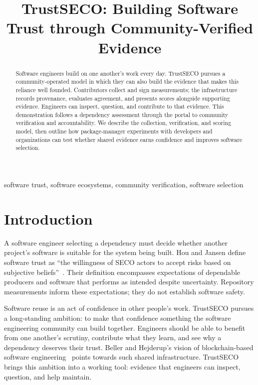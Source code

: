 \documentclass[10pt,conference]{IEEEtran}
\begin{document}
\title{TrustSECO: Building Software Trust through Community-Verified Evidence}
\author{}
\maketitle

\begin{abstract}
Software engineers build on one another's work every day. TrustSECO pursues a community-operated model in which they can also build the evidence that makes this reliance well founded. Contributors collect and sign measurements; the infrastructure records provenance, evaluates agreement, and presents scores alongside supporting evidence. Engineers can inspect, question, and contribute to that evidence. This demonstration follows a dependency assessment through the portal to community verification and accountability. We describe the collection, verification, and scoring model, then outline how package-manager experiments with developers and organizations can test whether shared evidence earns confidence and improves software selection.
\end{abstract}
\begin{IEEEkeywords}
software trust, software ecosystems, community verification, software selection
\end{IEEEkeywords}

\section{Introduction}
A software engineer selecting a dependency must decide whether another project's software is suitable for the system being built. Hou and Jansen define software trust as ``the willingness of SECO actors to accept risks based on subjective beliefs''~\cite[Sec.~4.1.6]{hou2023systematic}. Their definition encompasses expectations of dependable producers and software that performs as intended despite uncertainty. Repository measurements inform these expectations; they do not establish software safety.

Software reuse is an act of confidence in other people's work. TrustSECO pursues a long-standing ambition: to make that confidence something the software engineering community can build together. Engineers should be able to benefit from one another's scrutiny, contribute what they learn, and see why a dependency deserves their trust. Beller and Hejderup's vision of blockchain-based software engineering~\cite{beller2019blockchain} points towards such shared infrastructure. TrustSECO brings this ambition into a working tool: evidence that engineers can inspect, question, and help maintain.
\end{document}
